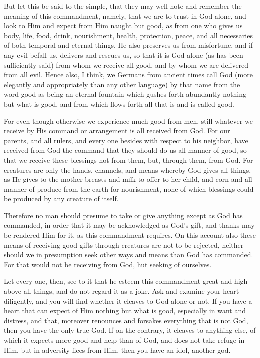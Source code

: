 But let this be said to the simple, that they may well note and
remember the meaning of this commandment, namely, that we are to trust
in God alone, and look to Him and expect from Him naught but good, as
from one who gives us body, life, food, drink, nourishment, health,
protection, peace, and all necessaries of both temporal and eternal
things. He also preserves us from misfortune, and if any evil befall
us, delivers and rescues us, so that it is God alone (as has been
sufficiently said) from whom we receive all good, and by whom we are
delivered from all evil. Hence also, I think, we Germans from ancient
times call God (more elegantly and appropriately than any other
language) by that name from the word good as being an eternal fountain
which gushes forth abundantly nothing but what is good, and from which
flows forth all that is and is called good.

For even though otherwise we experience much good from men, still
whatever we receive by His command or arrangement is all received from
God. For our parents, and all rulers, and every one besides with
respect to his neighbor, have received from God the command that they
should do us all manner of good, so that we receive these blessings not
from them, but, through them, from God. For creatures are only the
hands, channels, and means whereby God gives all things, as He gives to
the mother breasts and milk to offer to her child, and corn and all
manner of produce from the earth for nourishment, none of which
blessings could be produced by any creature of itself.

Therefore no man should presume to take or give anything except as God
has commanded, in order that it may be acknowledged as God's gift, and
thanks may be rendered Him for it, as this commandment requires. On
this account also these means of receiving good gifts through creatures
are not to be rejected, neither should we in presumption seek other
ways and means than God has commanded. For that would not be receiving
from God, hut seeking of ourselves.

Let every one, then, see to it that he esteem this commandment great
and high above all things, and do not regard it as a joke. Ask and
examine your heart diligently, and you will find whether it cleaves to
God alone or not. If you have a heart that can expect of Him nothing
but what is good, especially in want and distress, and that, moreover
renounces and forsakes everything that is not God, then you have the
only true God. If on the contrary, it cleaves to anything else, of
which it expects more good and help than of God, and does not take
refuge in Him, but in adversity flees from Him, then you have an idol,
another god.

